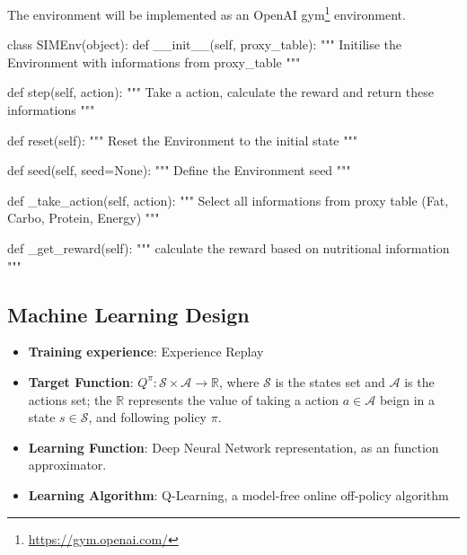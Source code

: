 \documentclass{article}
\begin{document}
The environment will be implemented as an OpenAI gym\footnote{\url{https://gym.openai.com/}} environment.

\begin{python}
class SIMEnv(object):
    def __init__(self, proxy_table):
        """ Initilise the Environment with informations from proxy_table """

    def step(self, action):
        """ Take a action, calculate the reward and return these informations """

    def reset(self):
        """ Reset the Environment to the initial state """

    def seed(self, seed=None):
        """ Define the Environment seed """

    def _take_action(self, action):
        """ Select all informations from proxy table (Fat, Carbo, Protein, Energy) """

    def _get_reward(self):
        """ calculate the reward based on nutritional information """

\end{python}

\subsection{Machine Learning Design}

\begin{itemize}
    \item \textbf{Training experience}: Experience Replay
    \item \textbf{Target Function}: \(Q^\pi: \mathcal{S} \times \mathcal{A} \to \mathbb{R} \), 
    where \( \mathcal{S} \) is the states set and \( \mathcal{A} \) is the actions set; 
    the \( \mathbb{R} \) represents the value of taking a action \( a \in \mathcal{A} \) 
    beign in a state \( s \in \mathcal{S} \), and following policy \(\pi\).
    \item \textbf{Learning Function}: Deep Neural Network representation, as an function approximator.
    \item \textbf{Learning Algorithm}: Q-Learning, a model-free online off-policy algorithm
\end{itemize}



\end{document}
